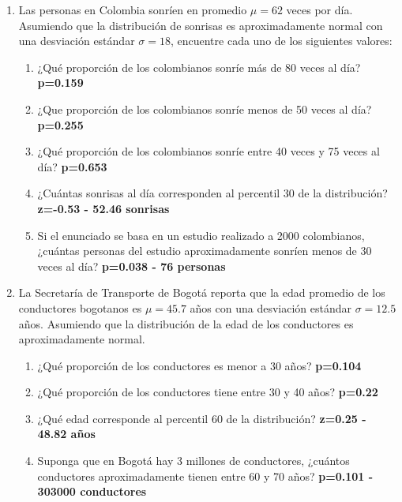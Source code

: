 \documentclass[letterpaper]{article}
\begin{document}
\begin{enumerate}
\item Las personas en Colombia sonríen en promedio $\mu=62$ veces por día. Asumiendo que la distribución de sonrisas es aproximadamente normal con una desviación estándar $\sigma=18$, encuentre cada uno de los siguientes valores:
\begin{enumerate}
	\item ¿Qué proporción de los colombianos sonríe más de 80 veces al día? {\bf p=0.159}
	\item ¿Que proporción de los colombianos sonríe menos de 50 veces al día? {\bf p=0.255}
	\item ¿Qué proporción de los colombianos sonríe entre 40 veces y 75 veces al día? {\bf p=0.653}
	\item ¿Cuántas sonrisas al día corresponden al percentil 30 de la distribución? {\bf z=-0.53 - 52.46 sonrisas}
	\item Si el enunciado se basa en un estudio realizado a 2000 colombianos, ¿cuántas personas del estudio aproximadamente sonríen menos de 30 veces al día? {\bf p=0.038 - 76 personas}
\end{enumerate}
\item La Secretaría de Transporte de Bogotá reporta que la edad promedio de los conductores bogotanos es $\mu=45.7$ años con una desviación estándar $\sigma=12.5$ años. Asumiendo que la distribución de la edad de los conductores es aproximadamente normal.
\begin{enumerate}
	\item ¿Qué proporción de los conductores es menor a 30 años? {\bf p=0.104}
	\item ¿Qué proporción de los conductores tiene entre 30 y 40 años? {\bf p=0.22}
	\item ¿Qué edad corresponde al percentil 60 de la distribución? {\bf z=0.25 - 48.82 años}
	\item Suponga que en Bogotá hay 3 millones de conductores, ¿cuántos conductores aproximadamente tienen entre 60 y 70 años? {\bf p=0.101 - 303000 conductores}
\end{enumerate}


\end{enumerate}
\end{document}
